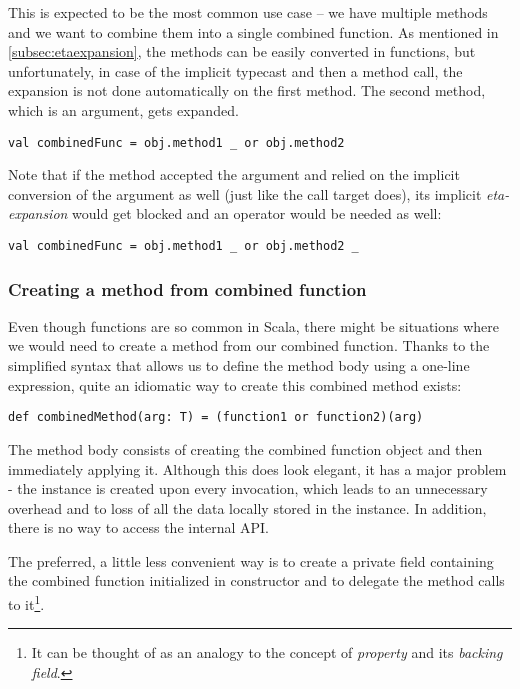 This is expected to be the most common use case -- we have multiple methods and we want to combine them into a single combined function. As mentioned in \ref{subsec:etaexpansion}, the methods can be easily converted in functions, but unfortunately, in case of the implicit typecast and then a method call, the expansion is not done automatically on the first method. The second method, which is an argument, gets expanded.

\lstset{style=Scala}
\begin{lstlisting}
val combinedFunc = obj.method1 _ or obj.method2
\end{lstlisting}

Note that if the  method accepted the  argument and relied on the implicit conversion of the argument as well (just like the call target does), its implicit \textit{eta-expansion} would get blocked and an operator \inlinecode{\_} would be needed as well:

\lstset{style=Scala}
\begin{lstlisting}
val combinedFunc = obj.method1 _ or obj.method2 _
\end{lstlisting}

\subsubsection{Creating a method from combined function}
\label{subsubsec:method_from_combined_func}

Even though functions are so common in Scala, there might be situations where we would need to create a method from our combined function. Thanks to the simplified syntax that allows us to define the method body using a one-line expression, quite an idiomatic way to create this combined method exists:

\lstset{style=Scala}
\begin{lstlisting}
def combinedMethod(arg: T) = (function1 or function2)(arg)
\end{lstlisting}

The method body consists of creating the combined function object and then immediately applying it. Although this does look elegant, it has a major problem - the  instance is created upon every invocation, which leads to an unnecessary overhead and to loss of all the data locally stored in the instance. In addition, there is no way to access the  internal API.

The preferred, a little less convenient way is to create a private field containing the combined function initialized in constructor and to delegate the method calls to it\footnote{It can be thought of as an analogy to the concept of \textit{property} and its \textit{backing field}.}.
 
